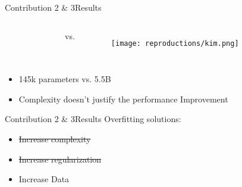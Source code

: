 \begin{frame}{Contribution 2 \& 3}{Results}
    \begin{columns}[c]
        \begin{figure}
            
        \end{figure}

        vs.

        \begin{figure}
            \texttt{[image: reproductions/kim.png]}
        \end{figure}
    \end{columns}

    \begin{table}[htbp]
        \centering
    \end{table}

    \begin{itemize}
        \item 145k parameters vs. 5.5B
        \item Complexity doesn't justify the performance Improvement
    \end{itemize}
\end{frame}

\begin{frame}{Contribution 2 \& 3}{Results}
    Overfitting solutions:
    \begin{itemize}
        \item \sout{Increase complexity}
        \item \sout{Increase regularization}
        \item Increase Data
    \end{itemize}
\end{frame}


